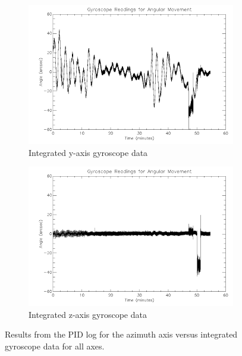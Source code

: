 \begin{figure}[htbp]
\begin{subfigure}{0.45\textwidth}
		\includegraphics[width=1\linewidth]{appendix/img/campaign_results/gyrointy.png}
		\caption{Integrated y-axis gyroscope data}
		\label{fig:sub:gyrointy}
	\end{subfigure}
	\begin{subfigure}{0.45\textwidth}
		\includegraphics[width=1\linewidth]{appendix/img/campaign_results/gyrointz.png}
		\caption{Integrated z-axis gyroscope data}
		\label{fig:sub:gyrointz}
	\end{subfigure}
	\caption{Results from the PID log for the azimuth axis versus integrated gyroscope data for all axes.}
	\label{fig:PIDvsgro}
\end{figure}

